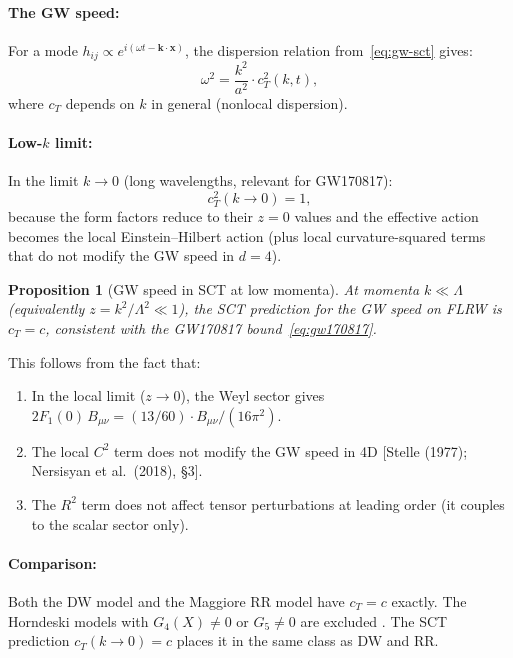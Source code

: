 \documentclass[12pt,a4paper]{article}
\newtheorem{proposition}{Proposition}[section]
\theoremstyle{definition}
\theoremstyle{remark}
\newcommand{\fromlit}[1]{\textcolor{blue!70!black}{\textsf{[#1]}}}
\begin{document}
\paragraph{The GW speed:}
For a mode $h_{ij} \propto e^{i(\omega t - \mathbf{k}\cdot\mathbf{x})}$,
the dispersion relation from~\eqref{eq:gw-sct} gives:
\begin{equation}\label{eq:gw-dispersion}
  \omega^2 = \frac{k^2}{a^2}\cdot c_T^2(k,t),
\end{equation}
where $c_T$ depends on $k$ in general (nonlocal dispersion).

\paragraph{Low-$k$ limit:}
In the limit $k \to 0$ (long wavelengths, relevant for GW170817):
\begin{equation}\label{eq:cT-lowk}
  c_T^2(k \to 0) = 1,
\end{equation}
because the form factors reduce to their $z = 0$ values and the
effective action becomes the local Einstein--Hilbert action
(plus local curvature-squared terms that do not modify the GW speed
in $d = 4$).

\begin{proposition}[GW speed in SCT at low momenta]
\label{prop:cT}
At momenta $k \ll \Lambda$ (equivalently $z = k^2/\Lambda^2 \ll 1$),
the SCT prediction for the GW speed on FLRW is
$c_T = c$, consistent with the GW170817 bound~\eqref{eq:gw170817}.
\end{proposition}

This follows from the fact that:
\begin{enumerate}[nosep]
  \item In the local limit ($z \to 0$), the Weyl sector gives
    $2F_1(0)\,B_{\mu\nu} = (13/60)\cdot B_{\mu\nu}/(16\pi^2)$.
  \item The local $C^2$ term does not modify the GW speed in 4D
    \fromlit{Stelle (1977); Nersisyan et al.\ (2018), \S3}.
  \item The $R^2$ term does not affect tensor perturbations at
    leading order (it couples to the scalar sector only).
\end{enumerate}

\paragraph{Comparison:} Both the DW model \cite{NLA18} and the
Maggiore RR model \cite{BDFM18} have $c_T = c$ exactly. The
Horndeski models with $G_4(X) \neq 0$ or $G_5 \neq 0$ are
excluded \cite{NLA18}. The SCT prediction $c_T(k \to 0) = c$
places it in the same class as DW and RR.
\end{document}
